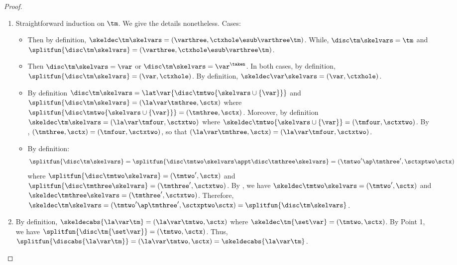 \begin{proof}
\hfill
\begin{enumerate}
\item Straightforward induction on $\tm$. We give the details nonetheless. Cases:
\begin{itemize}
\item {}
Then by definition, $\skeldec\tm\skelvars = (\varthree,\ctxhole\esub\varthree\tm)$.
While, $\disc\tm\skelvars = \tm$ and
$\splitfun{\disc\tm\skelvars} = (\varthree,\ctxhole\esub\varthree\tm)$.

\item \case{$\tm = \var$}
Then $\disc\tm\skelvars = \var$ or $\disc\tm\skelvars = \var^\taken$. In both cases, by definition, $\splitfun{\disc\tm\skelvars} = (\var,\ctxhole)$. By definition, $\skeldec\var\skelvars = (\var,\ctxhole)$.

\item {}
By definition $\disc\tm\skelvars = \lat\var{\disc\tmtwo{\skelvars \cup \{\var\}}}$ and $\splitfun{\disc\tm\skelvars} = (\la\var\tmthree,\sctx)$ where $\splitfun{\disc\tmtwo{\skelvars \cup \{\var\}}} = (\tmthree,\sctx)$.
Moreover, by definition $\skeldec\tm\skelvars = (\la\var\tmfour,\sctxtwo)$ where $\skeldec\tmtwo{\skelvars \cup \{\var\}}=(\tmfour,\sctxtwo)$.
By \ih, $(\tmthree,\sctx) =
(\tmfour,\sctxtwo)$, so that $(\la\var\tmthree,\sctx)= (\la\var\tmfour,\sctxtwo)$.

\item {}
By definition:
\[\splitfun{\disc\tm\skelvars} = \splitfun{\disc\tmtwo\skelvars\appt\disc\tmthree\skelvars} = (\tmtwo'\ap\tmthree',\sctxptwo\sctx)\] where
$\splitfun{\disc\tmtwo\skelvars} = (\tmtwo',\sctx)$ and $\splitfun{\disc\tmthree\skelvars} = (\tmthree', \sctxtwo)$.
By \ih, we have $\skeldec\tmtwo\skelvars= (\tmtwo',\sctx)$ and $\skeldec\tmthree\skelvars = (\tmthree', \sctxtwo)$.
Therefore, $\skeldec\tm\skelvars = (\tmtwo'\ap\tmthree',\sctxptwo\sctx) = \splitfun{\disc\tm\skelvars}$.
\end{itemize}


\item By definition, $\skeldecabs{\la\var\tm} = (\la\var\tmtwo, \sctx)$ where $\skeldec\tm{\set\var}=(\tmtwo,\sctx)$. By Point 1, we have $\splitfun{\disc\tm{\set\var}}=(\tmtwo,\sctx)$. Thus, $\splitfun{\discabs{\la\var\tm}} = (\la\var\tmtwo,\sctx)=\skeldecabs{\la\var\tm}$.\qedhere
\end{enumerate}
\end{proof}
